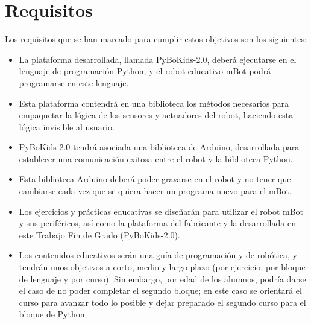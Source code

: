 \section{Requisitos}\label{sec:requisitos}
Los requisitos que se han marcado para cumplir estos objetivos son los siguientes:
\begin{itemize}
	\item La plataforma desarrollada, llamada PyBoKids-2.0, deberá ejecutarse en el lenguaje de programación Python, y el robot educativo mBot podrá programarse en este lenguaje.
	\item Esta plataforma contendrá en una biblioteca los métodos necesarios para empaquetar la lógica de los sensores y actuadores del robot, haciendo esta lógica invisible al usuario.
	\item PyBoKids-2.0 tendrá asociada una biblioteca de Arduino, desarrollada para establecer una comunicación exitosa entre el robot y la biblioteca Python. 
	\item Esta biblioteca Arduino deberá poder gravarse en el robot y no tener que cambiarse cada vez que se quiera hacer un programa nuevo para el mBot.
	\item Los ejercicios y prácticas educativas se diseñarán para utilizar el robot mBot y sus periféricos, así como la plataforma del fabricante y la desarrollada en este Trabajo Fin de Grado (PyBoKids-2.0).
	\item Los contenidos educativos serán una guía de programación y de robótica, y tendrán unos objetivos a corto, medio y largo plazo (por ejercicio, por bloque de lenguaje y por curso). Sin embargo, por edad de los alumnos, podría darse el caso de no poder completar el segundo bloque; en este caso se orientará el curso para avanzar todo lo posible y dejar preparado el segundo curso para el bloque de Python.  
\end{itemize}


